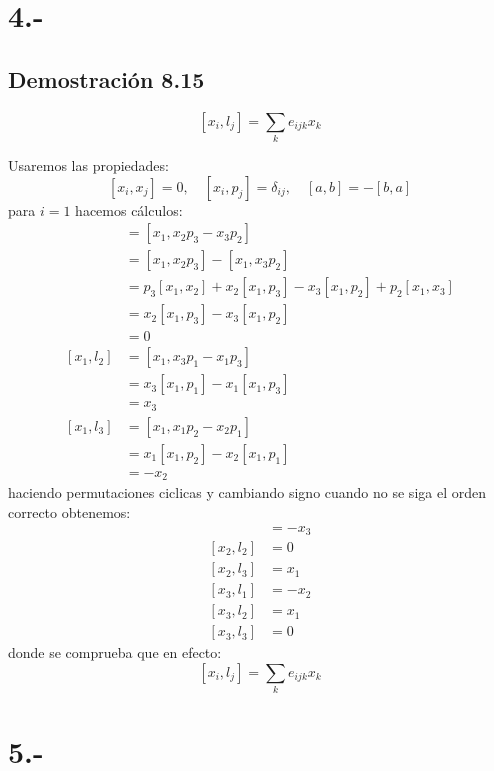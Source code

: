 \documentclass{article}
\begin{document}
\section*{4.-}
\subsection*{Demostración 8.15}
\[ [x_i,l_j] = \sum_{k}e_{ijk}x_k \]
\begin{tcolorbox}[breakable]
    Usaremos las propiedades:
    \[ [x_i,x_j] = 0, \quad [x_i,p_j] = \delta_{ij}, \quad [a,b] = -[b,a] \]
    para $i=1$ hacemos cálculos:
    \begin{align*}
        [x_1,l_1]
        &= [x_1, x_2p_3-x_3p_2] \\
        &= [x_1,x_2p_3] - [x_1,x_3p_2] \\
        &= p_3[x_1,x_2] + x_2[x_1,p_3] - x_3[x_1,p_2] + p_2[x_1,x_3] \\
        &= x_2[x_1,p_3] - x_3[x_1,p_2] \\ 
        &= 0 \\
        [x_1,l_2]
        &= [x_1,x_3p_1-x_1p_3] \\
        &= x_3[x_1,p_1] - x_1[x_1,p_3] \\
        &= x_3 \\
        [x_1,l_3] 
        &= [x_1, x_1p_2-x_2p_1] \\
        &= x_1[x_1,p_2]-x_2[x_1,p_1] \\
        &= -x_2
    \end{align*}
    haciendo permutaciones ciclicas y cambiando signo cuando no se siga el orden correcto obtenemos:
    \begin{align*}
        [x_2,l_1]
        &= -x_3 \\
        [x_2,l_2] 
        &= 0 \\
        [x_2,l_3]
        &= x_1 \\
        [x_3,l_1] 
        &= -x_2 \\
        [x_3,l_2]
        &= x_1 \\
        [x_3,l_3]
        &= 0
    \end{align*}
    donde se comprueba que en efecto:
    \[ [x_i,l_j] = \sum_{k}e_{ijk}x_k \]
\end{tcolorbox}

\section*{5.-}
\end{document}
